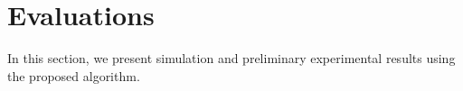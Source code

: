 \documentclass[letterpaper,10pt,conference]{ieeeconf}
\newcommand{\typetwo}{\textsc{Type II\ }}
\begin{document}


\section{Evaluations} \label{sec:sims}
In this section, we present simulation and preliminary experimental results using the proposed algorithm. 
\end{document}
